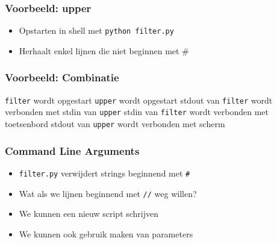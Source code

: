 \documentclass[dutch]{ucll-slides}
\begin{document}
\begin{frame}
  \frametitle{Voorbeeld: upper}
  \begin{itemize}
    \item Opstarten in shell met \texttt{python filter.py}
    \item Herhaalt enkel lijnen die niet beginnen met \#
  \end{itemize}
\end{frame}

\begin{frame}
  \frametitle{Voorbeeld: Combinatie}
  \begin{center}
  \end{center}
  \begin{overprint}
     \centering
    \texttt{filter} wordt opgestart
     \centering
    \texttt{upper} wordt opgestart
     \centering
    stdout van \texttt{filter} wordt verbonden met stdin van \texttt{upper}
     \centering
    stdin van \texttt{filter} wordt verbonden met toetsenbord
     \centering
    stdout van \texttt{upper} wordt verbonden met scherm
  \end{overprint}
\end{frame}

\begin{frame}
  \frametitle{Command Line Arguments}
  \begin{itemize}
    \item \texttt{filter.py} verwijdert strings beginnend met \texttt{\#}
    \item Wat als we lijnen beginnend met \texttt{//} weg willen?
    \item We kunnen een nieuw script schrijven
    \item We kunnen ook gebruik maken van parameters
  \end{itemize}
\end{frame}
\end{document}
